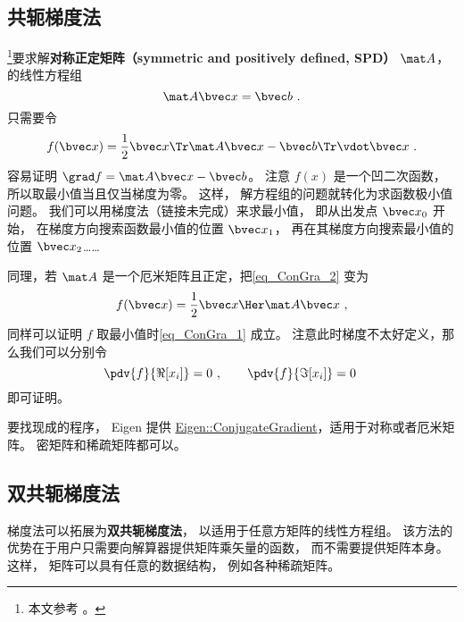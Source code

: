 
\begin{issues}
\issueDraft
\end{issues}


\subsection{共轭梯度法}

\footnote{本文参考 \cite{NR3}。}要求解\textbf{对称正定矩阵（symmetric and positively defined, SPD）} $\mat A$， 的线性方程组
\begin{equation}\label{eq_ConGra_1}
\mat A \bvec x = \bvec b~.
\end{equation}
只需要令
\begin{equation}\label{eq_ConGra_2}
f(\bvec x) = \frac{1}{2}\bvec x\Tr \mat A\bvec x - \bvec b\Tr \vdot \bvec x~.
\end{equation}
容易证明 $\grad f = \mat A \bvec x - \bvec b$。 注意 $f(x)$ 是一个凹二次函数， 所以取最小值当且仅当梯度为零。 这样， 解方程组的问题就转化为求函数极小值问题。 我们可以用梯度法（链接未完成）来求最小值， 即从出发点 $\bvec x_0$ 开始， 在梯度方向搜索函数最小值的位置 $\bvec x_1$， 再在其梯度方向搜索最小值的位置 $\bvec x_2$……

同理，若 $\mat A$ 是一个厄米矩阵且正定，把\autoref{eq_ConGra_2} 变为
\begin{equation}
f(\bvec x) = \frac{1}{2}\bvec x\Her \mat A \bvec x~,
\end{equation}
同样可以证明 $f$ 取最小值时\autoref{eq_ConGra_1} 成立。 注意此时梯度不太好定义，那么我们可以分别令
\begin{equation}
\pdv{f}{\Re[x_i]} = 0~, \qquad  \pdv{f}{\Im[x_i]} = 0~
\end{equation}
即可证明。

要找现成的程序， Eigen 提供 \href{https://eigen.tuxfamily.org/dox/classEigen_1_1ConjugateGradient.html}{Eigen::ConjugateGradient}，适用于对称或者厄米矩阵。 密矩阵和稀疏矩阵都可以。

\subsection{双共轭梯度法}

梯度法可以拓展为\textbf{双共轭梯度法}， 以适用于任意方矩阵的线性方程组。 该方法的优势在于用户只需要向解算器提供矩阵乘矢量的函数， 而不需要提供矩阵本身。 这样， 矩阵可以具有任意的数据结构， 例如各种稀疏矩阵。

